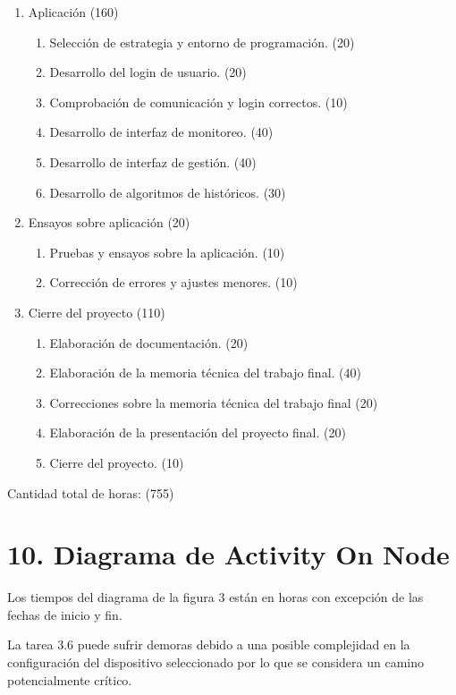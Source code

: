 \documentclass[
11pt, %
codirector, %
]{charter}
\begin{document}
\begin{enumerate}
\begin{enumerate}
	\end{enumerate}
\item Aplicación (160)
	\begin{enumerate}
	\item Selección de estrategia y entorno de programación. (20)
	\item Desarrollo del login de usuario. (20)
	\item Comprobación de comunicación y login correctos. (10)
    \item Desarrollo de interfaz de monitoreo. (40)
    \item Desarrollo de interfaz de gestión. (40)
	\item Desarrollo de algoritmos de históricos. (30)
	\end{enumerate}
\item Ensayos sobre aplicación (20)
	\begin{enumerate}
	\item Pruebas y ensayos sobre la aplicación. (10)
	\item Corrección de errores y ajustes menores. (10)
	\end{enumerate}
\item Cierre del proyecto (110)
	\begin{enumerate}
	\item Elaboración de documentación. (20)
	\item Elaboración de la memoria técnica del trabajo final. (40)
	\item Correcciones sobre la memoria técnica del trabajo final (20) 
	\item Elaboración de la presentación del proyecto final. (20)
	\item Cierre del proyecto. (10)
	\end{enumerate}
\end{enumerate}

Cantidad total de horas: (755)
 
\vspace{600px}

\section{10. Diagrama de Activity On Node}
\label{sec:AoN}

Los tiempos del diagrama de la figura 3 están en horas con excepción de las fechas de inicio y fin.

La tarea 3.6 puede sufrir demoras debido a una posible complejidad en la configuración del dispositivo seleccionado por lo que se considera un camino potencialmente crítico.
\end{document}
